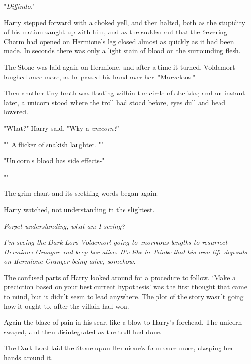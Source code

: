 "\emph{Diffindo.}"

Harry stepped forward with a choked yell, and then halted, both as the
stupidity of his motion caught up with him, and as the sudden cut that the
Severing Charm had opened on Hermione's leg closed almost as quickly as it had
been made. In seconds there was only a light stain of blood on the surrounding
flesh.

The Stone was laid again on Hermione, and after a time it turned. Voldemort
laughed once more, as he passed his hand over her. "Marvelous."

Then another tiny tooth was floating within the circle of obelisks; and an
instant later, a unicorn stood where the troll had stood before, eyes dull and
head lowered.

"What?" Harry said. "Why a \emph{unicorn?}"

"" A flicker of snakish laughter. ""

"Unicorn's blood has side effects-"

""

The grim chant and its seething words began again.

Harry watched, not understanding in the slightest.

\emph{Forget understanding, what am I seeing?}

\emph{I'm seeing the Dark Lord Voldemort going to enormous lengths to resurrect
Hermione Granger and keep her alive. It's like he thinks that his own life
depends on Hermione Granger being alive, somehow.}

The confused parts of Harry looked around for a procedure to follow. `Make a
prediction based on your best current hypothesis' was the first thought that
came to mind, but it didn't seem to lead anywhere. The plot of the story wasn't
going how it ought to, after the villain had won.

Again the blaze of pain in his scar, like a blow to Harry's forehead. The
unicorn swayed, and then disintegrated as the troll had done.

The Dark Lord laid the Stone upon Hermione's form once more, clasping her hands
around it.

